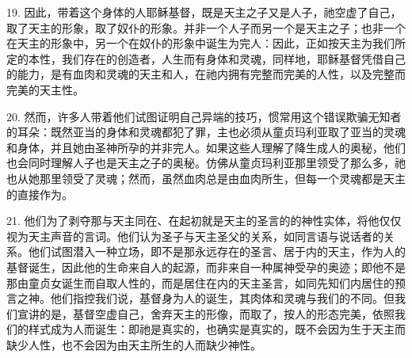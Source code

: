 19. 因此，带着这个身体的人耶稣基督，既是天主之子又是人子，祂空虚了自己，取了天主的形象，取了奴仆的形象。并非一个人子而另一个是天主之子；也非一个在天主的形象中，另一个在奴仆的形象中诞生为完人：因此，正如按天主为我们所定的本性，我们存在的创造者，人生而有身体和灵魂，同样地，耶稣基督凭借自己的能力，是有血肉和灵魂的天主和人，在祂内拥有完整而完美的人性，以及完整而完美的天主性。\par

20. 然而，许多人带着他们试图证明自己异端的技巧，惯常用这个错误欺骗无知者的耳朵：既然亚当的身体和灵魂都犯了罪，主也必须从童贞玛利亚取了亚当的灵魂和身体，并且她由圣神所孕的并非完人。如果这些人理解了降生成人的奥秘，他们也会同时理解人子也是天主之子的奥秘。仿佛从童贞玛利亚那里领受了那么多，祂也从她那里领受了灵魂；然而，虽然血肉总是由血肉所生，但每一个灵魂都是天主的直接作为。\par

21. 他们为了剥夺那与天主同在、在起初就是天主的圣言的的神性实体，将他仅仅视为天主声音的言词。他们认为圣子与天主圣父的关系，如同言语与说话者的关系。他们试图潜入一种立场，即不是那永远存在的圣言、居于内的天主，作为人的基督诞生，因此他的生命来自人的起源，而非来自一种属神受孕的奥迹；即他不是那由童贞女诞生而自取人性的，而是居住在内的天主圣言，如同先知们内居住的预言之神。他们指控我们说，基督身为人的诞生，其肉体和灵魂与我们的不同。但我们宣讲的是，基督空虚自己，舍弃天主的形像，而取了，按人的形态完美，依照我们的样式成为人而诞生：即祂是真实的，也确实是真实的，既不会因为生于天主而缺少人性，也不会因为由天主所生的人而缺少神性。\par

